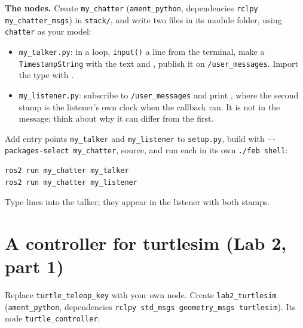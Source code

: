 \documentclass[11pt,a4paper]{article}
\begin{document}
\textbf{The nodes.} Create \texttt{my\_chatter} (\texttt{ament\_python}, dependencies
\texttt{rclpy my\_chatter\_msgs}) in \texttt{stack/}, and write two files in its module
folder, using \texttt{chatter} as your model:

\begin{itemize}
  \item \texttt{my\_talker.py}: in a loop, \texttt{input()} a line from the terminal, make a
  \texttt{TimestampString} with the text and ,
  publish it on \texttt{/user\_messages}. Import the type with
  .
  \item \texttt{my\_listener.py}: subscribe to \texttt{/user\_messages} and print
  , where the second stamp
  is the listener's own clock when the callback ran. It is not in the message; think about why
  it can differ from the first.
\end{itemize}

Add entry points \texttt{my\_talker} and \texttt{my\_listener} to \texttt{setup.py}, build with
\texttt{-{}-packages-select my\_chatter}, source, and run each in its own \texttt{./feb shell}:

\begin{lstlisting}
ros2 run my_chatter my_talker
ros2 run my_chatter my_listener
\end{lstlisting}

Type lines into the talker; they appear in the listener with both stamps.


\section{A controller for turtlesim (Lab 2, part 1)}
\label{sec:controller}

Replace \texttt{turtle\_teleop\_key} with your own node. Create \texttt{lab2\_turtlesim}
(\texttt{ament\_python}, dependencies \texttt{rclpy std\_msgs geometry\_msgs turtlesim}). Its
node \texttt{turtle\_controller}:
\end{document}
